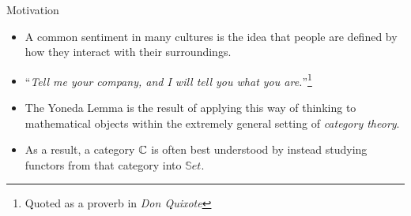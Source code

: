 \begin{frame}{Motivation}
 \begin{itemize}
  \item A common sentiment in many cultures is the idea that people are defined by how they interact with their surroundings.
  \pause\item ``\textit{Tell me your company, and I will tell you what you are.}''\footnote{Quoted as a proverb in \textit{Don Quixote}}
  \pause\item The Yoneda Lemma is the result of applying this way of thinking to mathematical objects within the extremely general setting of \textit{category theory}.
  \pause\item As a result, a category $\mathbb{C}$ is often best understood by instead studying functors from that category into $\mathbb{S}et$.
 \end{itemize}
\end{frame}

